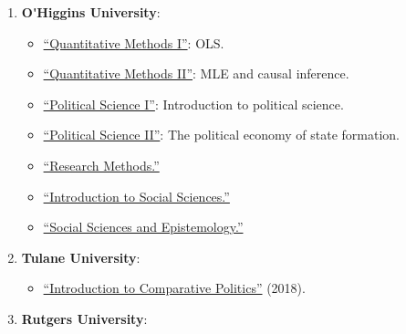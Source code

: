 \begin{enumerate}

\item {\bf O\'\unskip Higgins University}:
  
    \begin{itemize}
      \item[\textcolor{gray}{\textbullet}] \href{https://github.com/hbahamonde/OLS/raw/master/Bahamonde_OLS.pdf}{``Quantitative Methods I''}: {\color{gray}OLS}.
      \item[\textcolor{gray}{\textbullet}] \href{https://github.com/hbahamonde/MLE/raw/master/Bahamonde_MLE.pdf}{``Quantitative Methods II''}: {\color{gray}MLE and causal inference}.
      \item[\textcolor{gray}{\textbullet}] \href{https://github.com/hbahamonde/Ciencia_Politica_I/raw/master/Bahamonde_Ciencia_Politica_I.pdf}{``Political Science I''}: {\color{gray} Introduction to political science}.
      \item[\textcolor{gray}{\textbullet}] \href{https://github.com/hbahamonde/Ciencia_Politica_II/raw/master/Bahamonde_Ciencia_Politica_II.pdf}{``Political Science II''}: {\color{gray} The political economy of state formation}.
      \item[\textcolor{gray}{\textbullet}] \href{https://github.com/hbahamonde/Metodos_de_Investigacion/raw/master/Bahamonde_Metodos_de_Investigacion.pdf}{``Research Methods.''}
      \item[\textcolor{gray}{\textbullet}] \href{https://github.com/hbahamonde/Intro_Ciencias_Sociales/raw/master/Bahamonde_Intro_Ciencias_Sociales.pdf}{``Introduction to Social Sciences.''}
      \item[\textcolor{gray}{\textbullet}] \href{https://github.com/hbahamonde/Social_Sciences_Epistemology_UGRAD/raw/master/Bahamonde_Social_Sciences_Epistemology_UGRAD_Syllabus.pdf}{``Social Sciences and Epistemology.''}
    \end{itemize}

\item {\bf Tulane University}:
  
    \begin{itemize}
      \item[\textcolor{gray}{\textbullet}] \href{https://github.com/hbahamonde/Comparative_Politics_UGRAD/raw/master/Bahamonde_Comparative_Politics_Syllabus_UGRAD.pdf}{``Introduction to Comparative Politics''} (2018).
    \end{itemize}

\item {\bf Rutgers University}:


\end{enumerate}
